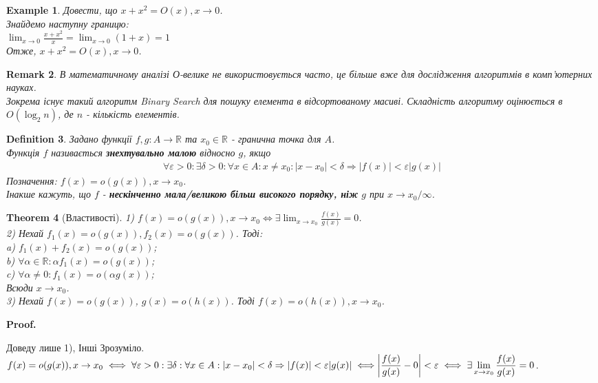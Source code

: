 \documentclass[a4paper, 14pt]{article}
\makeatletter
\def\qed{$\blacksquare$}
\theoremstyle{theoremdd}
\newtheorem{theorem}{Theorem}[subsection]
\theoremstyle{theoremdd}
\newtheorem{definition}[theorem]{Definition}
\theoremstyle{theoremdd}
\theoremstyle{theoremdd}
\newtheorem{example}[theorem]{Example}
\theoremstyle{theoremdd}
\theoremstyle{theoremdd}
\newtheorem{remark}[theorem]{Remark}
\theoremstyle{theoremdd}
\theoremstyle{theoremdd}
\renewenvironment{proof}[1][Proof.\\]{\par
\pushQED{\hfill \qed}%
\normalfont \topsep6\p@\@plus6\p@\relax
\trivlist
\item\relax
{\bfseries
#1\@addpunct{.}}\hspace\labelsep\ignorespaces
}{%
\popQED\endtrivlist\@endpefalse
}
\makeatother
\begin{document}
\begin{example}
Довести, що $x+x^2 = O(x), x \to 0$.\\
Знайдемо наступну границю:\\
$\displaystyle \lim_{x \to 0} \frac{x+x^2}{x} = \lim_{x \to 0}(1+x) = 1$\\
Отже, $x+x^2 = O(x), x \to 0$.
\end{example}

\begin{remark}
В математичному аналізі О-велике не використовується часто, це більше вже для дослідження алгоритмів в комп'ютерних науках.\\
Зокрема існує такий алгоритм Binary Search для пошуку елемента в відсортованому масиві. Складність алгоритму оцінюється в $O(\log_2 n)$, де $n$ - кількість елементів.
\end{remark}

\begin{definition}
Задано функції $f,g: A \to \mathbb{R}$ та $x_0 \in \mathbb{R}$ - гранична точка для $A$.\\
Функція $f$ називається \textbf{знехтувально малою} відносно $g$, якщо
\begin{align*}
\forall \varepsilon>0: \exists \delta > 0: \forall x \in A: x \neq x_0: |x-x_0| < \delta \Rightarrow |f(x)| < \varepsilon |g(x)|
\end{align*}
Позначення: $f(x) = o(g(x)), x \to x_0$.\\
Інакше кажуть, що $f$ - \textbf{нескінченно мала/великою більш високого порядку, ніж} $g$ при $x \to x_0/\infty$.
\end{definition}

\begin{theorem}[Властивості]
1) $f(x) = o(g(x)), x \to x_0 \iff \displaystyle \exists \lim_{x \to x_0} \frac{f(x)}{g(x)} = 0$.
\bigskip \\
2) Нехай $f_1(x) = o(g(x)), f_2(x) = o(g(x))$. Тоді:\\
a) $f_1(x) + f_2(x) = o(g(x))$;\\
b) $\forall \alpha \in \mathbb{R}: \alpha f_1(x) = o(g(x))$;\\
c) $\forall \alpha \neq 0: f_1(x) = o(\alpha g(x))$;\\
Всюди $x \to x_0$.
\bigskip \\
3) Нехай $f(x) = o(g(x))$, $g(x) = o(h(x))$. Тоді $f(x) = o(h(x)), x \to x_0$.
\end{theorem}

\begin{proof}
Доведу лише 1), Інші Зрозуміло.\\
$f(x) = o(g(x)),x \to x_0 \iff \forall \varepsilon>0: \exists \delta: \forall x \in A: |x-x_0| < \delta \Rightarrow |f(x)| < \varepsilon |g(x)| \iff \\ \displaystyle \abs{\frac{f(x)}{g(x)} - 0} < \varepsilon \iff \exists \lim_{x \to x_0} \frac{f(x)}{g(x)} = 0$.
\end{proof}
\end{document}
